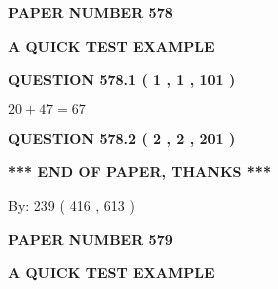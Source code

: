 \documentclass[12pt]{article}
\begin{document}
   
 {\textbf{ \Large{ PAPER NUMBER  578  }}}
   
   
\vspace{0.2in}
   
   
   
   
   
   
 \vspace{0.2in}
{\LARGE {\textbf{ A QUICK TEST EXAMPLE}}}
   
   
  
\vspace{0.2in}
  
{\textbf{\Large{QUESTION
578.1 
 ( 1 , 1 , 101 )
}}}
  
  
 
 

$ %
20 +  %
47=   %
67$
 
 
  
\vspace{0.2in}
  
{\textbf{\Large{QUESTION
578.2 
 ( 2 , 2 , 201 )
}}}
  
  
   
   
 \vspace{0.2in}
 
   
   
   
   
\vspace{1.0in} 
{\textbf{\large{ *** END OF PAPER, THANKS *** }}} 
   
   
\hspace{1.0in} By: 
 239 ( 416 ,  613 )
   
   
   
   
\newpage 
\setcounter{page}{ 
   579001 } 
   
   
   
   
 {\textbf{ \Large{ PAPER NUMBER  579  }}}
   
   
\vspace{0.2in}
   
   
   
   
   
   
 \vspace{0.2in}
{\LARGE {\textbf{ A QUICK TEST EXAMPLE}}}
   
   
  
\vspace{0.2in}
  
\end{document}
